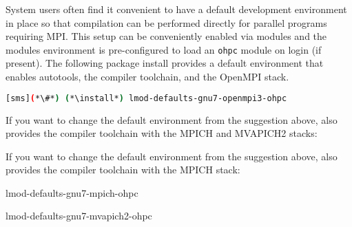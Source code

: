 System users often find it convenient to have a default development environment
in place so that compilation can be performed directly for parallel programs
requiring MPI. This setup can be conveniently enabled via modules and the \OHPC{}
modules environment is pre-configured to load an \texttt{ohpc} module on login
(if present). The following package install provides a default
environment that enables autotools, the \GNU{} compiler toolchain, and the
OpenMPI stack.

\begin{lstlisting}[language=bash]
[sms](*\#*) (*\install*) lmod-defaults-gnu7-openmpi3-ohpc
\end{lstlisting}

\begin{center}
\begin{tcolorbox}[]
\small
{}
If you want to change the default environment from the suggestion above, \OHPC{}
also provides the \GNU{} compiler toolchain with the MPICH and MVAPICH2 stacks:
\fi

If you want to change the default environment from the suggestion above, \OHPC{}
also provides the \GNU{} compiler toolchain with the MPICH stack:
\fi

\begin{itemize*}
\item lmod-defaults-gnu7-mpich-ohpc
\item lmod-defaults-gnu7-mvapich2-ohpc
\fi
\end{itemize*}
\end{tcolorbox}
\end{center}
